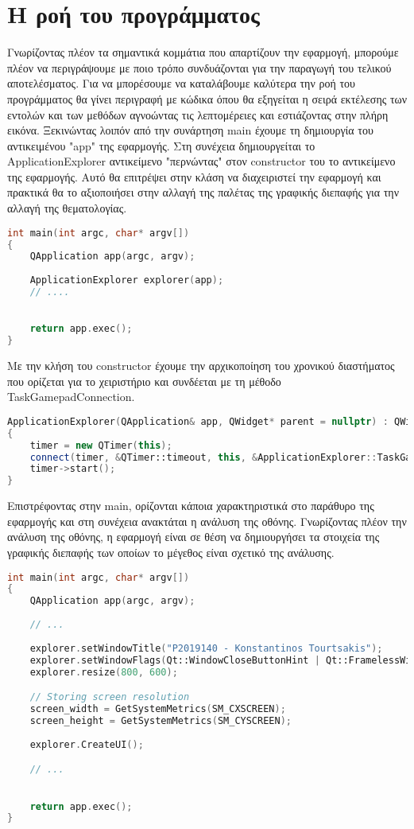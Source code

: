 \section{Η ροή του προγράμματος}
Γνωρίζοντας πλέον τα σημαντικά κομμάτια που απαρτίζουν την εφαρμογή, μπορούμε πλέον να περιγράψουμε
με ποιο τρόπο συνδυάζονται για την παραγωγή του τελικού αποτελέσματος. Για να μπορέσουμε να καταλάβουμε
καλύτερα την ροή του προγράμματος θα γίνει περιγραφή με κώδικα όπου θα εξηγείται η σειρά εκτέλεσης
των εντολών και των μεθόδων αγνοώντας τις λεπτομέρειες και εστιάζοντας στην πλήρη εικόνα. Ξεκινώντας
λοιπόν από την συνάρτηση main έχουμε τη δημιουργία του αντικειμένου "app" της εφαρμογής. Στη συνέχεια
δημιουργείται το ApplicationExplorer αντικείμενο "περνώντας" στον constructor του το αντικείμενο της 
εφαρμογής. Αυτό θα επιτρέψει στην κλάση να διαχειριστεί την εφαρμογή και πρακτικά θα το αξιοποιήσει
στην αλλαγή της παλέτας της γραφικής διεπαφής για την αλλαγή της θεματολογίας. 
\begin{lstlisting}[language=C++, style=cppstyle]
int main(int argc, char* argv[]) 
{
    QApplication app(argc, argv);
    
    ApplicationExplorer explorer(app);
    // ....
    

    return app.exec();
}
\end{lstlisting}

Με την κλήση του constructor έχουμε την αρχικοποίηση του χρονικού διαστήματος που ορίζεται για το
χειριστήριο και συνδέεται με τη μέθοδο TaskGamepadConnection.

\begin{lstlisting}[language=C++, style=cppstyle]
ApplicationExplorer(QApplication& app, QWidget* parent = nullptr) : QWidget(parent), app(app)
{
    timer = new QTimer(this);
    connect(timer, &QTimer::timeout, this, &ApplicationExplorer::TaskGamepadConnection);
    timer->start();
}
\end{lstlisting}

Επιστρέφοντας στην main, ορίζονται κάποια χαρακτηριστικά στο παράθυρο της εφαρμογής και στη συνέχεια
ανακτάται η ανάλυση της οθόνης. Γνωρίζοντας πλέον την ανάλυση της οθόνης, η εφαρμογή είναι σε θέση να
δημιουργήσει τα στοιχεία της γραφικής διεπαφής των οποίων το μέγεθος είναι σχετικό της ανάλυσης.

\begin{lstlisting}[language=C++, style=cppstyle]
int main(int argc, char* argv[]) 
{
    QApplication app(argc, argv);
    
    // ...
    
    explorer.setWindowTitle("P2019140 - Konstantinos Tourtsakis");
    explorer.setWindowFlags(Qt::WindowCloseButtonHint | Qt::FramelessWindowHint);
    explorer.resize(800, 600);

    // Storing screen resolution
    screen_width = GetSystemMetrics(SM_CXSCREEN);
    screen_height = GetSystemMetrics(SM_CYSCREEN);
    
    explorer.CreateUI();

    // ...

    
    return app.exec();
}
\end{lstlisting}

